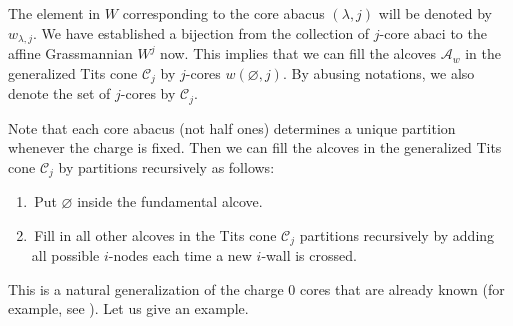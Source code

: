 \documentclass[11pt]{amsart}
\theoremstyle{plain}
\numberwithin{equation}{subsection}
\newcommand{\lam}{\lambda}
\begin{document}
The element in $W$ corresponding to the core abacus $(\lam, j)$ will be denoted by $w_{\lam, j}$.
We have established a bijection from the collection of $j$-core abaci to the affine Grassmannian $W^j$ now.
This implies that we can fill the alcoves $\mathcal{A}_w$ in the generalized Tits cone $\mathcal{C}_j$ by $j$-cores $w(\varnothing, j)$.
By abusing notations, we also denote the set of $j$-cores by $\mathcal{C}_j$.

Note that each core abacus (not half ones) determines a unique partition whenever the charge is fixed.
Then we can fill the alcoves in the generalized Tits cone $\mathcal{C}_j$ by partitions recursively as follows:
\begin{enumerate}
  \item [\rm (1)] \,Put $\varnothing$ inside the fundamental alcove.
  \item [\rm (2)] \,Fill in all other alcoves in the Tits cone $\mathcal{C}_j$ partitions recursively by adding all possible
$i$-nodes each time a new $i$-wall is crossed.
\end{enumerate}
This is a natural generalization of the charge 0 cores that are already known (for example, see \cite[Fig 5]{BCG}).
Let us give an example.
\end{document}
